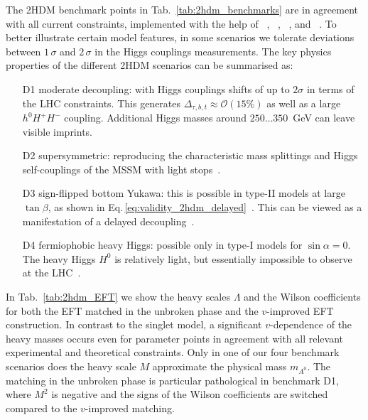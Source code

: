 The 2HDM benchmark points in Tab.~\ref{tab:2hdm_benchmarks} are in
agreement with all current constraints, implemented with the help of
~\cite{2hdmc},
~\cite{higgsbounds},
~\cite{superiso}, and
~\cite{higgssignals}. To better illustrate
certain model features, in some scenarios we tolerate deviations
between $1\,\sigma$ and $2\,\sigma$ in the Higgs couplings
measurements.  The key physics properties of the different 2HDM
scenarios can be summarised as:
%
\begin{itemize}
\item[D1] moderate decoupling: with Higgs couplings shifts of up to
$2\sigma$ in terms of the LHC constraints.  This generates
$\Delta_{\tau,b,t} \approx \mathcal{O}(15\%)$ as well as a large $h^0
H^+ H^-$ coupling. Additional Higgs masses around $250\dots350$~GeV
can leave visible imprints.
\item[D2] supersymmetric: reproducing the characteristic mass
splittings and Higgs self-couplings of the MSSM with light
stops~\cite{Carena:2013qia}.
\item[D3] sign-flipped bottom Yukawa: this is possible in type-II
models at large $\tan\beta$, as shown in
Eq.\,\eqref{eq:validity_2hdm_delayed}~\cite{Ferreira:2014naa}. This can be
viewed as a manifestation of a delayed decoupling~\cite{Haber:2000kq}.
\item[D4] fermiophobic heavy Higgs: possible only in type-I models for
$\sin\alpha =0$. The heavy Higgs $H^0$ is relatively light, but
essentially impossible to observe at the LHC~\cite{Hespel:2014sla,
fermiophobic}.
\end{itemize}
%
In Tab.~\ref{tab:2hdm_EFT} we show the heavy scales $\Lambda$ and the
Wilson coefficients for both the EFT matched in the unbroken phase and
the $v$-improved EFT construction. In contrast to the singlet model, a
significant $v$-dependence of the heavy masses occurs even for
parameter points in agreement with all relevant experimental and
theoretical constraints. Only in one of our four benchmark scenarios
does the heavy scale $M$ approximate the physical mass $m_{A^0}$. The
matching in the unbroken phase is particular pathological in benchmark
D1, where $M^2$ is negative and the signs of the Wilson coefficients
are switched compared to the $v$-improved matching.


